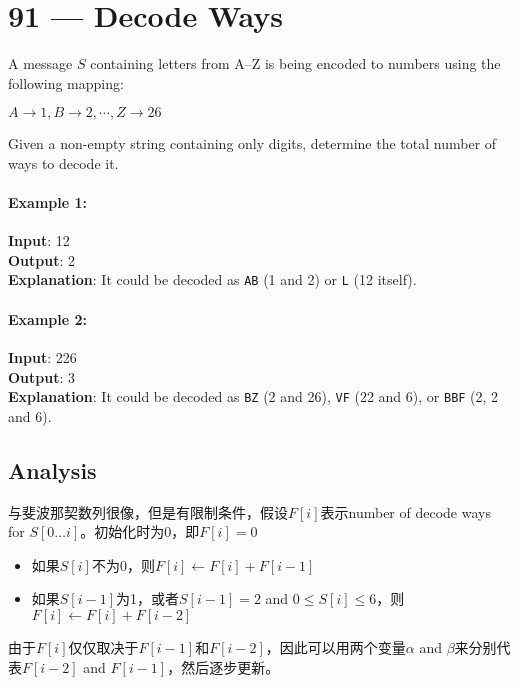 \section{91 --- Decode Ways}
A message $S$ containing letters from A--Z is being encoded to numbers using the following mapping:
\par
$A\to 1, B\to 2, \cdots, Z\to 26$
\par
Given a non-empty string containing only digits, determine the total number of ways to decode it.
\paragraph{Example 1:}
\begin{flushleft}
\textbf{Input}: 12
\\
\textbf{Output}: 2
\\
\textbf{Explanation}: It could be decoded as \texttt{AB} (1 and 2) or \texttt{L} (12 itself).
\end{flushleft}
\paragraph{Example 2:}
\begin{flushleft}
\textbf{Input}: 226
\\
\textbf{Output}: 3
\\
\textbf{Explanation}: It could be decoded as \texttt{BZ} (2 and 26), \texttt{VF} (22 and 6), or \texttt{BBF} (2, 2 and 6).
\end{flushleft}
\subsection{Analysis}
\begin{CJK*}{UTF8}{gbsn}
与斐波那契数列很像，但是有限制条件，假设$F[i]$表示number of decode ways for $S[0\ldots i]$。初始化时为0，即$F[i] = 0$
\begin{itemize}
\item 如果$S[i]$不为0，则$F[i] \gets F[i] + F[i-1]$
\item 如果$S[i-1]$为1，或者$S[i-1]=2$ and $0\leq S[i]\leq 6$，则$F[i] \gets F[i] + F[i-2]$
\end{itemize}
由于$F[i]$仅仅取决于$F[i-1]$和$F[i-2]$，因此可以用两个变量$\alpha$ and $\beta$来分别代表$F[i-2]$ and $F[i-1]$，然后逐步更新。
\end{CJK*}
